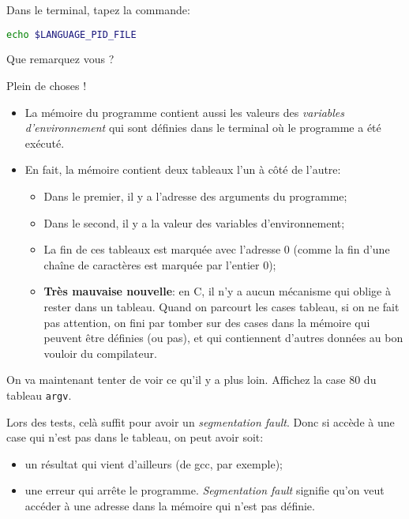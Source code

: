 \question Dans le terminal, tapez la commande:
\begin{lstlisting}[language=bash]
  echo $LANGUAGE_PID_FILE
\end{lstlisting}
Que remarquez vous ?

\begin{solution}
  Plein de choses !
  \begin{itemize}
  \item La mémoire du programme contient aussi les valeurs des
    \emph{variables d'environnement} qui sont définies dans le
    terminal où le programme a été exécuté.
  \item En fait, la mémoire contient deux tableaux l'un à côté de l'autre:
    \begin{itemize}
    \item Dans le premier, il y a l'adresse des arguments du programme;
    \item Dans le second, il y a la valeur des variables d'environnement;
    \item La fin de ces tableaux est marquée avec l'adresse 0 (comme
      la fin d'une chaîne de caractères est marquée par l'entier 0);
    \item \textbf{Très mauvaise nouvelle}: en C, il n'y a aucun
      mécanisme qui oblige à rester dans un tableau. Quand on parcourt
      les cases tableau, si on ne fait pas attention, on fini par
      tomber sur des cases dans la mémoire qui peuvent être définies
      (ou pas), et qui contiennent d'autres données au bon vouloir du
      compilateur. 
    \end{itemize}
  \end{itemize}

\end{solution}

\question On va maintenant tenter de voir ce qu'il y a plus
loin. Affichez la case 80 du tableau \texttt{argv}.

\begin{solution}
  Lors des tests, celà suffit pour avoir un \emph{segmentation
    fault}. Donc si accède à une case qui n'est pas dans le tableau, on peut
  avoir soit:
  \begin{itemize}
  \item un résultat qui vient d'ailleurs (de gcc, par exemple);
  \item une erreur qui arrête le programme. \emph{Segmentation fault}
    signifie qu'on veut accéder à une adresse dans la mémoire qui
    n'est pas définie.
  \end{itemize}
\end{solution}